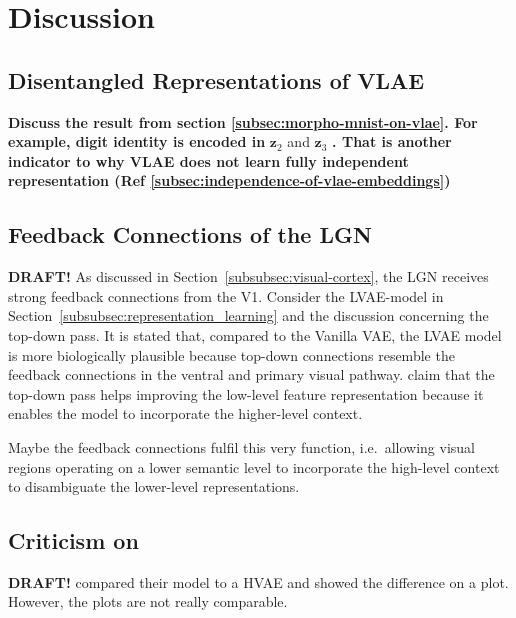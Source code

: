 \documentclass[11pt]{article}
\begin{document}
    \section{Discussion}\label{sec:discussion}

    \subsection{Disentangled Representations of VLAE}
    \textbf{Discuss the result from section \ref{subsec:morpho-mnist-on-vlae}. For example, digit identity is encoded in} $\bm{z}_2$ and $\bm{z}_3$ \textbf{. That is another indicator to why VLAE does not learn fully independent representation (Ref \ref{subsec:independence-of-vlae-embeddings})}

\subsection{Feedback Connections of the \acl{LGN}}\label{subsec:feedback-connections-of-the-lateral-geniculate-nucleus}
\textbf{DRAFT!}
As discussed in Section~\ref{subsubsec:visual-cortex}, the \ac{LGN} receives strong feedback connections from the \ac{V1}.
Consider the \ac{LVAE}-model in Section~\ref{subsubsec:representation_learning} and the discussion concerning the top-down pass.
It is stated that, compared to the Vanilla VAE, the \ac{LVAE} model is more biologically plausible because top-down connections resemble the feedback connections in the ventral and primary visual pathway.
\citet{sonderby2016ladder} claim that the top-down pass helps improving the low-level feature representation because it enables the model to incorporate the higher-level context.

Maybe the feedback connections fulfil this very function, i.e.\ allowing visual regions operating on a lower semantic level to incorporate the high-level context to disambiguate the lower-level representations.

\subsection{Criticism on \citet{zhao2017learning}}
\textbf{DRAFT!}
\citet{zhao2017learning} compared their model to a HVAE and showed the difference on a plot.
However, the plots are not really comparable.
\end{document}
